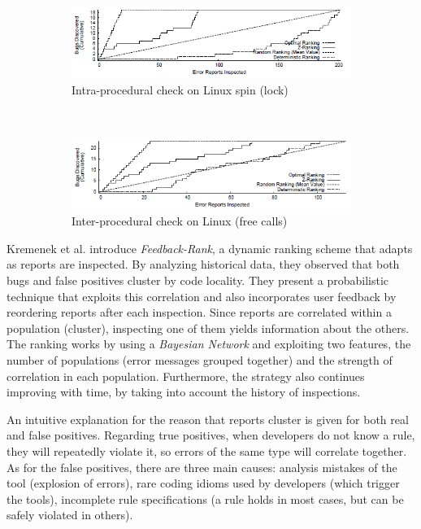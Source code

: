  \begin{figure}[H]
     \begin{subfigure}{1\textwidth}
         \centering
         \includegraphics[scale=0.7]{./src/z_ranking_result_linux_intra.png}
         \caption{Intra-procedural check on Linux spin (lock)}
     \end{subfigure}\\
     \begin{subfigure}{1\textwidth}
         \centering
         \includegraphics[scale=0.7]{./src/z_ranking_result_linux_inter.png}
         \caption{Inter-procedural check on Linux (free calls)}
     \end{subfigure}
 	 \caption{}
 \end{figure}


 \label{lit:fbrank}
 Kremenek et al. \cite{correlation_exploitation} introduce \textit{Feedback-Rank}, a dynamic ranking scheme that adapts as reports are inspected. By analyzing historical data, they observed that both bugs and false positives cluster by code locality. They present a probabilistic technique that exploits this correlation and also incorporates user feedback by reordering reports after each inspection. Since reports are correlated within a population (cluster), inspecting one of them yields information about the others. The ranking works by using a \textit{Bayesian Network} and exploiting two features, the number of populations (error messages grouped together) and the strength of correlation in each population. Furthermore, the strategy also continues improving with time, by taking into account the history of inspections.

 An intuitive explanation for the reason that reports cluster is given for both real and false positives. Regarding true positives, when developers do not know a rule, they will repeatedly violate it, so errors of the same type will correlate together. As for the false positives, there are three main causes: analysis mistakes of the tool (explosion of errors), rare coding idioms used by developers (which trigger the tools), incomplete rule specifications (a rule holds in most cases, but can be safely violated in others).

